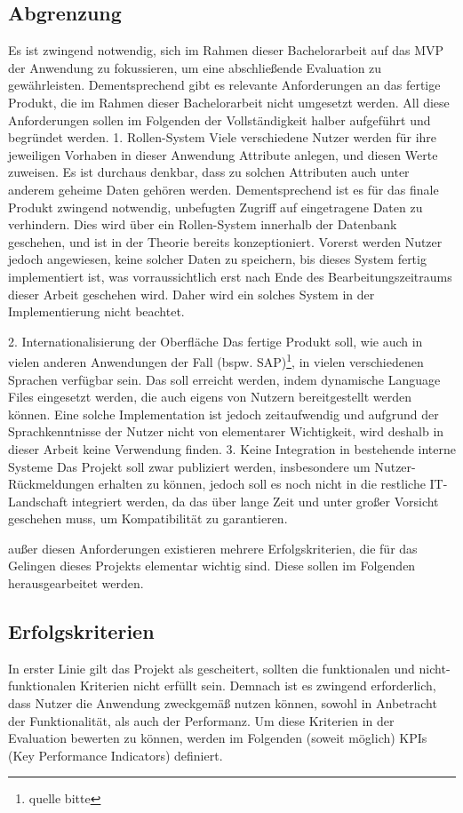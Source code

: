 \subsection{Abgrenzung}
Es ist zwingend notwendig, sich im Rahmen dieser Bachelorarbeit auf das MVP der Anwendung zu fokussieren, um eine abschließende
Evaluation zu gewährleisten. Dementsprechend gibt es relevante Anforderungen an das fertige Produkt, die im Rahmen dieser Bachelorarbeit 
nicht umgesetzt werden. All diese Anforderungen sollen im Folgenden der Vollständigkeit halber aufgeführt und begründet werden.\break
\large{1. Rollen-System}\break
Viele verschiedene Nutzer werden für ihre jeweiligen Vorhaben in dieser Anwendung Attribute anlegen, und diesen Werte zuweisen. Es ist durchaus denkbar,
dass zu solchen Attributen auch unter anderem geheime Daten gehören werden. Dementsprechend ist es für das finale Produkt zwingend notwendig, unbefugten Zugriff
auf eingetragene Daten zu verhindern. Dies wird über ein Rollen-System innerhalb der Datenbank geschehen, und ist in der Theorie bereits konzeptioniert. Vorerst werden
Nutzer jedoch angewiesen, keine solcher Daten zu speichern, bis dieses System fertig implementiert ist, was vorraussichtlich erst nach Ende des Bearbeitungszeitraums dieser 
Arbeit geschehen wird. Daher wird ein solches System in der Implementierung nicht beachtet.

\large{2. Internationalisierung der Oberfläche}\break
Das fertige Produkt soll, wie auch in vielen anderen Anwendungen der Fall (bspw. SAP)\footnote{quelle bitte}, in vielen verschiedenen Sprachen verfügbar sein. 
Das soll erreicht werden, indem dynamische Language Files eingesetzt werden, die auch eigens von Nutzern bereitgestellt werden können. Eine solche Implementation 
ist jedoch zeitaufwendig und aufgrund der Sprachkenntnisse der Nutzer nicht von elementarer Wichtigkeit, wird deshalb in dieser Arbeit keine Verwendung finden.\break
\large{3. Keine Integration in bestehende interne Systeme}\break
Das Projekt soll zwar publiziert werden, insbesondere um Nutzer-Rückmeldungen erhalten zu können, jedoch soll es noch nicht in die restliche IT-Landschaft integriert werden,
da das über lange Zeit und unter großer Vorsicht geschehen muss, um Kompatibilität zu garantieren.

außer diesen Anforderungen existieren mehrere Erfolgskriterien, die für das Gelingen dieses Projekts elementar wichtig sind. Diese sollen im Folgenden
herausgearbeitet werden.
\subsection{Erfolgskriterien}
In erster Linie gilt das Projekt als gescheitert, sollten die funktionalen und nicht-funktionalen Kriterien nicht erfüllt sein. 
Demnach ist es zwingend erforderlich, dass Nutzer die Anwendung zweckgemäß nutzen können, sowohl in Anbetracht der Funktionalität, als auch 
der Performanz. Um diese Kriterien in der Evaluation bewerten zu können, werden im Folgenden (soweit möglich) KPIs (Key Performance Indicators) definiert.
